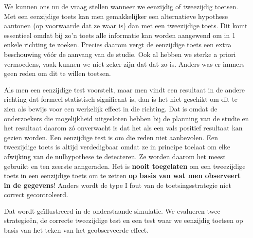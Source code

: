 \documentclass[
  dutch,
  letterpaper,
  12pt]{book}
\theoremstyle{definition}
\theoremstyle{definition}
\theoremstyle{definition}
\theoremstyle{remark}
\begin{document}
We kunnen ons nu de vraag stellen wanneer we eenzijdig of tweezijdig
toetsen. Met een eenzijdige toets kan men gemakkelijker een alternatieve
hypothese aantonen (op voorwaarde dat ze waar is) dan met een
tweezijdige toets. Dit komt essentieel omdat bij zo'n toets alle
informatie kan worden aangewend om in 1 enkele richting te zoeken.
Precies daarom vergt de eenzijdige toets een extra beschouwing vóór de
aanvang van de studie. Ook al hebben we sterke a priori vermoedens, vaak
kunnen we niet zeker zijn dat dat zo is. Anders was er immers geen reden
om dit te willen toetsen.

Als men een eenzijdige test voorstelt, maar men vindt een resultaat in
de andere richting dat formeel statistisch significant is, dan is het
niet geschikt om dit te zien als bewijs voor een werkelijk effect in die
richting. Dat is omdat de onderzoekers die mogelijkheid uitgesloten
hebben bij de planning van de studie en het resultaat daarom zó
onverwacht is dat het als een vals positief resultaat kan gezien worden.
Een eenzijdige test is om die reden niet aanbevolen. Een tweezijdige
toets is altijd verdedigbaar omdat ze in principe toelaat om elke
afwijking van de nulhypothese te detecteren. Ze worden daarom het meest
gebruikt en ten zeerste aangeraden. Het is \textbf{nooit toegelaten} om
een tweezijdige toets in een eenzijdige toets om te zetten \textbf{op
basis van wat men observeert in de gegevens}! Anders wordt de type I
fout van de toetsingsstrategie niet correct gecontroleerd.

Dat wordt geïllustreerd in de onderstaande simulatie. We evalueren twee
strategieën, de correcte tweezijdige test en een test waar we eenzijdig
toetsen op basis van het teken van het geobserveerde effect.
\end{document}
